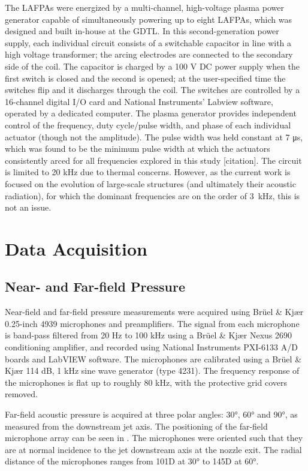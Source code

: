 The LAFPAs were energized by a multi-channel, high-voltage plasma power generator capable of simultaneously powering up to eight LAFPAs, which was designed and built in-house at the GDTL. 
In this second-generation power supply, each individual circuit consists of a switchable capacitor in line with a high voltage transformer; the arcing electrodes are connected to the secondary side of the coil. 
The capacitor is charged by a 100 V DC power supply when the first switch is closed and the second is opened; at the user-specified time the switches flip and it discharges through the coil. 
The switches are controlled by a 16-channel digital I/O card and National Instruments' Labview software, operated by a dedicated computer. The plasma generator provides independent control of the frequency, duty cycle/pulse width, and phase of each individual actuator (though not the amplitude). 
The pulse width was held constant at 7 μs, which was found to be the minimum pulse width at which the actuators consistently arced for all frequencies explored in this study [citation]. 
The circuit is limited to 20 kHz due to thermal concerns.
However, as the current work is focused on the evolution of large-scale structures (and ultimately their acoustic radiation), for which the dominant frequencies are on the order of 3~kHz, this is not an issue.

\section{Data Acquisition}
\subsection{Near- and Far-field Pressure}
Near-field and far-field pressure measurements were acquired using Br\"{u}el \& Kj\ae{}r 0.25-inch 4939 microphones and preamplifiers. 
The signal from each microphone is band-pass filtered from 20 Hz to 100 kHz using a Br\"{u}el \& Kj\ae{}r Nexus 2690 conditioning amplifier, and recorded using National Instruments PXI-6133 A/D boards and LabVIEW software. 
The microphones are calibrated using a Br\"{u}el \& Kj\ae{}r 114 dB, 1 kHz sine wave generator (type 4231). 
The frequency response of the microphones is flat up to roughly 80 kHz, with the protective grid covers removed. 

Far-field acoustic pressure is acquired at three polar angles: 30°, 60° and 90°, as measured from the downstream jet axis. 
The positioning of the far-field microphone array can be seen in .
The microphones were oriented such that they are at normal incidence to the jet downstream axis at the nozzle exit. 
The radial distance of the microphones ranges from 101D at 30° to 145D at 60°. 

